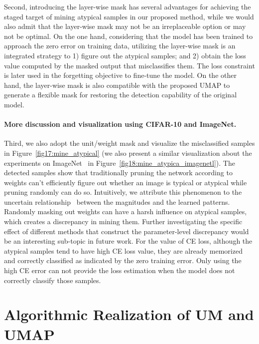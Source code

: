 \documentclass{article}
\theoremstyle{plain}
\theoremstyle{definition}
\theoremstyle{remark}
\begin{document}
Second, introducing the layer-wise mask has several advantages for achieving the staged target of mining atypical samples in our proposed method, while we would also admit that the layer-wise mask may not be an irreplaceable option or may not be optimal. On the one hand, considering that the model has been trained to approach the zero error on training data, utilizing the layer-wise mask is an integrated strategy to 1) figure out the atypical samples; and 2) obtain the loss value computed by the masked output that misclassifies them. The loss constraint is later used in the forgetting objective to fine-tune the model. On the other hand, the layer-wise mask is also compatible with the proposed UMAP to generate a flexible mask for restoring the detection capability of the original model.

\paragraph{More discussion and visualization using CIFAR-10 and ImageNet.} Third, we also adopt the unit/weight mask \citep{han2015deep} and visualize the misclassified samples in Figure~\ref{fig17:mine_atypical} (we also present a similar visualization about the experiments on ImageNet~\citep{deng2009imagenet} in Figure~\ref{fig18:mine_atypica_imagenetl}). The detected samples show that traditionally pruning the network according to weights can't efficiently figure out whether an image is typical or atypical while pruning randomly can do so. Intuitively, we attribute this phenomenon to the uncertain relationship~\citep{gal2016dropout} between the magnitudes and the learned patterns. Randomly masking out weights can have a harsh influence on atypical samples, which creates a discrepancy in mining them. Further investigating the specific effect of different methods that construct the parameter-level discrepancy would be an interesting sub-topic in future work. For the value of CE loss, although the atypical samples tend to have high CE loss value, they are already memorized and correctly classified as indicated by the zero training error. Only using the high CE error can not provide the loss estimation when the model does not correctly classify those samples. 


\clearpage
\section{Algorithmic Realization of UM and UMAP}
\label{app:algo_realization}
\end{document}
